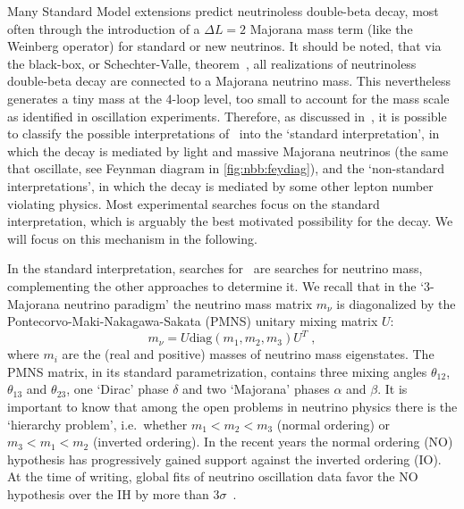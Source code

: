 Many Standard Model extensions predict neutrinoless double-beta decay, most
often through the introduction of a $\Delta L = 2$ Majorana mass term (like the
Weinberg operator) for standard or new neutrinos.  It should be noted, that via
the black-box, or Schechter-Valle, theorem~\cite{Schechter1982}, all
realizations of neutrinoless double-beta decay are connected to a Majorana
neutrino mass. This nevertheless generates a tiny mass at the 4-loop level, too
small to account for the mass scale as identified in oscillation experiments.
Therefore, as discussed in~\cite{Rodejohann2011}, it is possible to classify
the possible interpretations of \onbb\ into the `standard interpretation',
in which the decay is mediated by light and massive Majorana neutrinos (the
same that oscillate, see Feynman diagram in \cref{fig:nbb:feydiag}), and the
`non-standard interpretations', in which the decay is mediated by some
other lepton number violating physics. Most
experimental searches focus on the standard interpretation, which is
arguably the best motivated possibility for the decay. We will focus on this
mechanism in the following.

In the standard interpretation, searches for \onbb\ are searches for
neutrino mass, complementing the other approaches to determine it. We recall that
in the `3-Majorana neutrino paradigm' the neutrino mass matrix $m_\nu$ is diagonalized
by the Pontecorvo-Maki-Nakagawa-Sakata (PMNS) unitary mixing matrix $U$:
\[
  m_\nu = U \text{diag}(m_1, m_2, m_3) U^T \;,
\]
where $m_i$ are the (real and positive) masses of neutrino mass eigenstates.
The PMNS matrix, in its standard parametrization, contains three mixing angles
$\theta_{12}$, $\theta_{13}$ and $\theta_{23}$, one `Dirac' phase $\delta$ and
two `Majorana' phases $\alpha$ and $\beta$. It is important to know that among
the open problems in neutrino physics there is the `hierarchy problem',
i.e.~whether $m_1 < m_2 < m_3$ (normal ordering) or $m_3 < m_1 < m_2$ (inverted
ordering).  In the recent years the normal ordering (NO) hypothesis has
progressively gained support against the inverted ordering (IO). At the time of
writing, global fits of neutrino oscillation data favor the NO hypothesis over
the IH by more than $3\sigma$~\cite{Esteban2019}.

